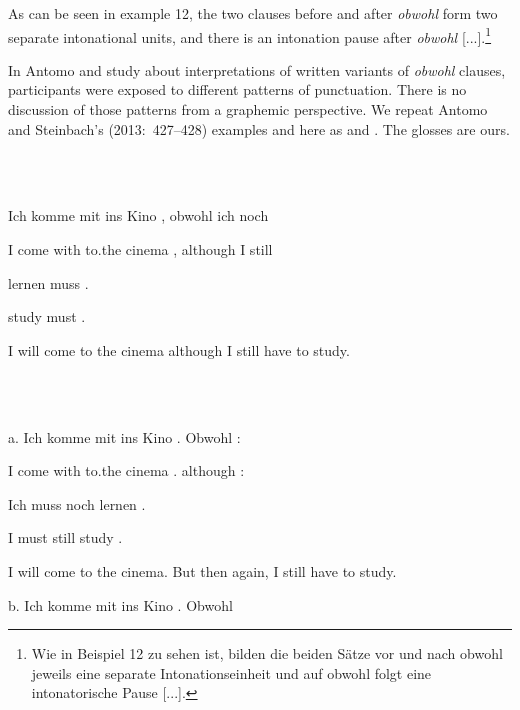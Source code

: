 As can be seen in exam\-ple 12, the two clauses before and after \textit{obwohl} form two separate intonational units, and there is an intonation pause after \textit{obwohl} [...].\footnote{Wie in Beispiel 12 zu sehen ist, bilden die beiden Sätze vor und nach obwohl jeweils eine separate Intonationseinheit und auf obwohl folgt eine intonatorische Pause [...].}



In Antomo and  study about interpretations of written variants of \textit{obwohl} clauses, participants were exposed to different patterns of punctuation. There is no discussion of those patterns from a graphemic perspective. We repeat Antomo and Steinbach’s (2013:~427–428) examples  and  here as  and . The glosses are ours.



\ea%
    \label{ex:key:6}
    \gll\\
        \\
    \glt
    \z

          Ich  komme  mit  ins  Kino    ,  obwohl  ich  noch



I  come    with  to.the  cinema  ,  although  I  still



lernen  muss  .



study    must  .



I will come to the cinema although I still have to study.



\ea%
    \label{ex:key:7}
    \gll\\
        \\
    \glt
    \z

          a.  Ich  komme  mit  ins  Kino    .  Obwohl  :



I  come    with  to.the  cinema  .  although  :



Ich  muss  noch lernen  .



I  must  still  study  .



I will come to the cinema. But then again, I still have to study.



b.  Ich  komme  mit  ins  Kino    .  Obwohl



